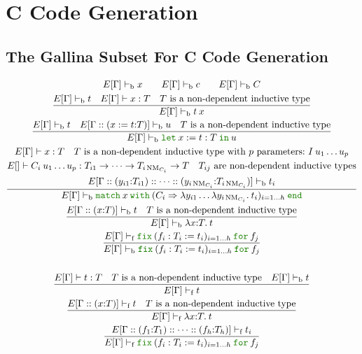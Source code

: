\documentclass[a4paper,fleqn]{article}
\def\gallina{\textrm{Gallina}}
\newcommand{\kwlet}{\mbox{\color{mygreen}\ttfamily let}}
\newcommand{\kwin}{\mbox{\color{mygreen}\ttfamily in}}
\newcommand{\kwmatch}{\mbox{\color{mygreen}\ttfamily match}}
\newcommand{\kwwith}{\mbox{\color{mygreen}\ttfamily with}}
\newcommand{\kwend}{\mbox{\color{mygreen}\ttfamily end}}
\newcommand{\kwfix}{\mbox{\color{mygreen}\ttfamily fix}}
\newcommand{\kwfor}{\mbox{\color{mygreen}\ttfamily for}}
\newcommand{\lamT}[3]{\lambda #1\mathord{:}#2.\:#3}
\newcommand{\lamB}[1]{\lambda #1.\:}
\newcommand{\lassum}[2]{(#1\mathord{:}#2)}
\newcommand{\ldef}[3]{(#1:=#2\mathord{:}#3)}
\newcommand{\letin}[3]{\kwlet\:#1:=#2\:\kwin\:#3}
\newcommand{\match}[4]{\kwmatch\:#1\:\kwwith\:(#2 \Rightarrow #3)_{#4}\:\kwend}
\newcommand{\fix}[4]{\kwfix\:(#1 := #2)_{#3}\:\kwfor\:#4}
\DeclareMathOperator{\NM}{NM}
\newcommand{\vdashb}{\vdash_{\textrm{b}}}
\newcommand{\vdashf}{\vdash_{\textrm{f}}}
\begin{document}
\section{C Code Generation}\label{sec:c-code-gen}
\subsection{The \gallina{} Subset For C Code Generation}\label{sec:gallinasubsetforcgen}
\raggedright
\begin{gather*}
  E[\Gamma] \vdashb x \qquad
  E[\Gamma] \vdashb c \qquad
  E[\Gamma] \vdashb C \\
  \dfrac{
    E[\Gamma] \vdashb t \quad
    E[\Gamma] \vdash x : T \quad
    \text{$T$ is a non-dependent inductive type}
  }{
    E[\Gamma] \vdashb t\:x
  } \\
  \dfrac{
    E[\Gamma] \vdashb t \quad
    E[\Gamma::\ldef{x}{t}{T}] \vdashb u \quad
    \text{$T$ is a non-dependent inductive type}
  }{
    E[\Gamma] \vdashb \letin{x}{t:T}{u}
  } \\
  \dfrac{
    \begin{gathered}
      E[\Gamma] \vdash x:T \quad
      \text{$T$ is a non-dependent inductive type with $p$ parameters:}~I\:u_1\ldots u_p \\
      E[] \vdash C_i\:u_1\ldots u_p: T_{i1} \rightarrow \dotsb \rightarrow T_{i\NM_{C_i}} \rightarrow T \quad
      \text{$T_{ij}$ are non-dependent inductive types} \\
      E[\Gamma::\lassum{y_{i1}}{T_{i1}}::\dotsb::\lassum{y_{i\NM_{C_i}}}{T_{i\NM_{C_i}}}] \vdashb t_i
    \end{gathered}
  }{
    E[\Gamma] \vdashb \match{x}{C_i}{\lambda y_{i1}\ldots\lamB{y_{i\NM_{C_i}}}t_i}{i=1\ldots h}
  } \\
  \dfrac{
    E[\Gamma::\lassum{x}{T}] \vdashb t \quad
    \text{$T$ is a non-dependent inductive type}
  }{
    E[\Gamma] \vdashb \lamT{x}{T}{t}
  } \\
  \dfrac{
    E[\Gamma] \vdashf \fix{f_i:T_i}{t_i}{i=1\ldots h}{f_j}
  }{
    E[\Gamma] \vdashb \fix{f_i:T_i}{t_i}{i=1\ldots h}{f_j}
  } \\
  \\
  \dfrac{
    E[\Gamma] \vdash t : T \quad
    \text{$T$ is a non-dependent inductive type} \quad
    E[\Gamma] \vdashb t
  }{
    E[\Gamma] \vdashf t
  } \\
  \dfrac{
    E[\Gamma::\lassum{x}{T}] \vdashf t \quad
    \text{$T$ is a non-dependent inductive type}
  }{
    E[\Gamma] \vdashf \lamT{x}{T}{t}
  } \\
  \dfrac{
    E[\Gamma::\lassum{f_1}{T_1}::\dotsb::\lassum{f_h}{T_h}] \vdashf t_i
  }{
    E[\Gamma] \vdashf \fix{f_i:T_i}{t_i}{i=1\ldots h}{f_j}
  }
\end{gather*}
\end{document}
